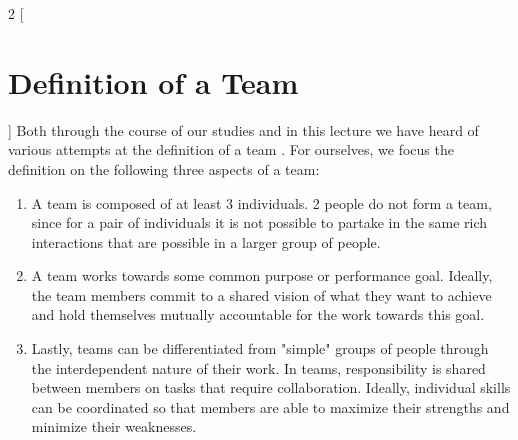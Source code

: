 \begin{multicols}{2}
[\section{Definition of a Team}]
Both through the course of our studies and in this lecture we have heard of various attempts at the definition of a team \cite{katzenbach2003the,BuildingBlocks}. 
For ourselves, we focus the definition on the following three aspects of a team:

  \begin{enumerate}[1.]
	\item A team is composed of at least 3 individuals. 2 people do not form a team, since for a pair of individuals it is not possible to partake in the same rich interactions that are possible in a larger group of people.
	\item A team works towards some common purpose or performance goal. Ideally, the team members commit to a shared vision of what they want to achieve and hold themselves mutually accountable for the work towards this goal.
	\item Lastly, teams can be differentiated from "simple" groups of people through the interdependent nature of their work. In teams, responsibility is shared between members on tasks that require collaboration. Ideally, individual skills can be coordinated so that members are able to maximize their strengths and minimize their weaknesses.
  \end{enumerate}
\end{multicols}